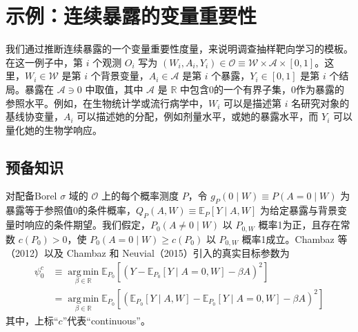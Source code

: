 \section{示例：连续暴露的变量重要性}

我们通过推断连续暴露的一个变量重要性度量，来说明调查抽样靶向学习的模板。在这一例子中，第 $i$ 个观测 $O_i$ 写为 $(W_i,A_i,Y_i)\in\mathcal O\equiv\mathcal W\times\mathcal A\times[0,1]$。这里，$W_i\in\mathcal W$ 是第 $i$ 个背景变量，$A_i\in\mathcal A$ 是第 $i$ 个暴露，$Y_i\in[0,1]$ 是第 $i$ 个结局。暴露在 $\mathcal A\ni0$ 中取值，其中 $\mathcal A$ 是 $\mathbb R$ 中包含0的一个有界子集，0作为暴露的参照水平。例如，在生物统计学或流行病学中，$W_i$ 可以是描述第 $i$ 名研究对象的基线协变量，$A_i$ 可以描述她的分配，例如剂量水平，或她的暴露水平，而 $Y_i$ 可以量化她的生物学响应。

\subsection{预备知识}

对配备Borel $\sigma$ 域的 $\mathcal O$ 上的每个概率测度 $P$，令 $g_P(0\mid W)\equiv P(A=0\mid W)$ 为暴露等于参照值0的条件概率，$Q_P(A,W)\equiv\mathbb E_P[Y\mid A,W]$ 为给定暴露与背景变量时响应的条件期望。我们假定，$P_0(A\ne0\mid W)$ 以 $P_{0,W}$ 概率1为正，且存在常数 $c(P_0)>0$，使 $P_0(A=0\mid W)\ge c(P_0)$ 以 $P_{0,W}$ 概率1成立。Chambaz 等（2012）以及 Chambaz 和 Neuvial（2015）引入的真实目标参数为
\[
\begin{aligned}
\psi_0^c
&\equiv\operatorname*{arg\,min}_{\beta\in\mathbb R}
\mathbb E_{P_0}\!\left[\left(Y-\mathbb E_{P_0}[Y\mid A=0,W]-\beta A\right)^2\right]\\
&=\operatorname*{arg\,min}_{\beta\in\mathbb R}
\mathbb E_{P_0}\!\left[\left(\mathbb E_{P_0}[Y\mid A,W]
-\mathbb E_{P_0}[Y\mid A=0,W]-\beta A\right)^2\right]
\end{aligned}
\]
其中，上标“$c$”代表“continuous”。

